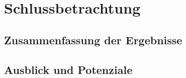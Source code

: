 \chapter{Schlussbetrachtung}
\section{Zusammenfassung der Ergebnisse}
\section{Ausblick und Potenziale}
